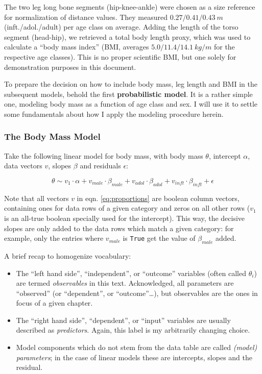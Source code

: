 The two leg long bone segments (hip-knee-ankle) were chosen as a size reference for normalization of distance values. They measured \(0.27/0.41/0.43\ m\) (inft./adol./adult) per age class on average.
Adding the length of the torso segment (head-hip), we retrieved a total body length proxy, which was used to calculate a ``body mass index'' (BMI, averages \(5.0/11.4/14.1\ kg/m\) for the respective age classes).
This is no proper scientific BMI, but one solely for demonstration purposes in this document.
\medskip

To prepare the decision on how to include body mass, leg length and BMI in the subsequent models, behold the first \textbf{probabilistic model}.
It is a rather simple one, modeling body mass as a function of age class and sex.
I will use it to settle some fundamentals about how I apply the modeling procedure herein.

\subsubsection{The Body Mass Model}
\label{sec:orge4d1e9b}
Take the following linear model for body mass, with body mass \(\theta\), intercept \(\alpha\), data vectors \(v\), slopes \(\beta\) and residuals \(\epsilon\):

\begin{equation} \theta \sim v_{1}\cdot\alpha + v_{male}\cdot\beta_{male} + v_{adol}\cdot\beta_{adol} + v_{inft}\cdot\beta_{inft} + \epsilon \label{eq:proportions} \end{equation}

Note that all vectors \(v\) in eqn. \eqref{eq:proportions} are boolean column vectors, containing ones for data rows of a given category and zeros on all other rows (\(v_{1}\) is an all-true boolean specially used for the intercept).
This way, the decisive slopes are only added to the data rows which match a given category: for example, only the entries where \(v_{male}\) is \texttt{True} get the value of \(\beta_{male}\) added.

A brief recap to homogenize vocabulary:
\begin{itemize}
\item The ``left hand side'', ``independent'', or ``outcome'' variables (often called \(\theta_{i}\)) are termed \emph{observables} in this text. Acknowledged, all parameters are ``observed'' (or ``dependent'', or ``outcome''\ldots{}), but observables are the ones in focus of a given chapter.
\item The ``right hand side'', ``dependent'', or ``input'' variables are usually described as \emph{predictors}. Again, this label is my arbitrarily changing choice.
\item Model components which do not stem from the data table are called \emph{(model) parameters}; in the case of linear models these are intercepts, slopes and the residual.
\end{itemize}

